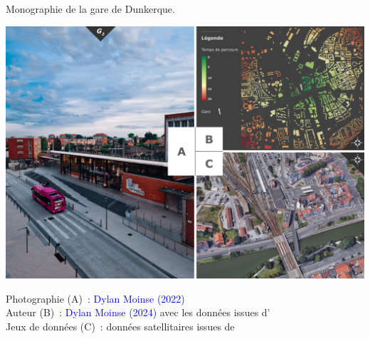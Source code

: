 \begin{refsegment}
        \begin{carte}[h!]\vspace*{4pt}
        \caption{Monographie de la gare de Dunkerque.}
        \label{fig-chap3:monographie-dunkerque}
        \centerline{\includegraphics[height=.35\pageheight]{src/Figures/Chap-3/FR_Gare_Dunkerque.jpg}}
        \vspace{5pt}
        \begin{flushright}\scriptsize{
        Photographie (A)~: \textcolor{blue}{Dylan Moinse (2022)}
        \\
        Auteur (B)~: \textcolor{blue}{Dylan Moinse (2024)} avec les données issues d'\textcolor{blue}{\textcite{openstreetmap_openstreetmap_2023}}
        \\
      Jeux de données (C)~: données satellitaires issues de \textcolor{blue}{\textcite{google_earth_google_2023}}
      }\end{flushright}
      \end{carte}


\end{refsegment}
